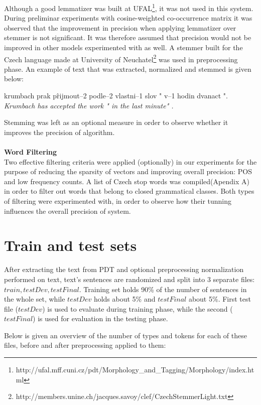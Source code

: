 Although a good lemmatizer was built at 
UFAL\footnote{http://ufal.mff.cuni.cz/pdt/Morphology\_and\_Tagging/Morphology/index.html}, it was not 
used 
in this system. During preliminar experiments with cosine-weighted co-occurrence matrix it was observed 
that the improvement in precision when applying lemmatizer over stemmer is not significant. It was 
therefore
assumed that precision would not be improved in other models experimented with as well. 
A stemmer built for the Czech language made at University of 
Neuchatel\footnote{http://members.unine.ch/jacques.savoy/clef/CzechStemmerLight.txt} was used in 
preprocessing 
phase.  An example of text that 
was extracted, normalized and stemmed is given below:
\begin{examples}
\item krumbach prak p\^rijmout--2 podle--2 vlastni--1 slov " v--1 hodin dvanact ". 
\glt \textit{  Krumbach has accepted the work " in the last minute"  .} 
\end{examples}
Stemming was left as an optional measure in order to observe whether it improves the precision of algorithm.
\\\\  \textbf{Word Filtering}
\\Two effective filtering criteria were applied (optionally) in our experiments for the purpose of reducing the sparsity of vectors and improving overall precision: POS and low frequency counts. A list of Czech stop words was compiled(Apendix A) in order to filter out words that belong to closed grammatical classes. Both types of filtering were experimented with, in order to observe how their tunning influences the overall precision of system.

\section{Train and test sets}\label{trainTestSet}

After extracting the text from PDT and optional preprocessing normalization performed on text, text's 
sentences are randomized and split into 3 separate files: $train, testDev, testFinal$. Training set holds 
90\% of the number of sentences in the whole set, while $testDev$ holds about 5\% and $testFinal$ 
about 5\%. First test file 
($testDev$) is used to evaluate during training phase, while the second ($ testFinal$) is used for 
evaluation in the testing phase. 

Below is given an overview of the number of types and tokens for each of these files, before and after 
preprocessing applied to them:

